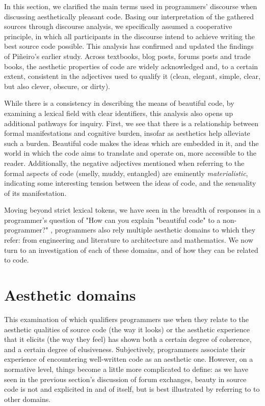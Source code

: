 \vspace{1\baselineskip}

In this section, we clarified the main terms used in programmers' discourse when discussing aesthetically pleasant code. Basing our interpretation of the gathered sources through discourse analysis, we specifically assumed a cooperative principle, in which all participants in the discourse intend to achieve writing the best source code possible. This analysis has confirmed and updated the findings of Piñeiro's earlier study. Across textbooks, blog posts, forums posts and trade books, the aesthetic properties of code are widely acknowledged and, to a certain extent, consistent in the adjectives used to qualify it (clean, elegant, simple, clear, but also clever, obscure, or dirty).

While there is a consistency in describing the means of beautiful code, by examining a lexical field with clear identifiers, this analysis also opens up additional pathways for inquiry. First, we see that there is a relationship between formal manifestations and cognitive burden, insofar as aesthetics help alleviate such a burden. Beautiful code makes the ideas which are embedded in it, and the world in which the code aims to translate and operate on, more accessible to the reader. Additionally, the negative adjectives mentioned when referring to the formal aspects of code (smelly, muddy, entangled) are eminently \emph{materialistic}, indicating some interesting tension between the ideas of code, and the sensuality of its manifestation.

Moving beyond strict lexical tokens, we have seen in the breadth of responses in a programmer's question of "How can you explain "beautiful code" to a non-programmer?" \citep{how_2013a}, programmers also rely multiple aesthetic domains to which they refer: from engineering and literature to architecture and mathematics. We now turn to an investigation of each of these domains, and of how they can be related to code.

\pagebreak

\section{Aesthetic domains}
\label{sec:aesthetic-domains}

This examination of which qualifiers programmers use when they relate to the aesthetic qualities  of source code (the way it looks) or the aesthetic experience that it elicits (the way they feel) has shown both a certain degree of coherence, and a certain degree of elusiveness. Subjectively, programmers associate their experience of encountering well-written code as an aesthetic one. However, on a normative level, things become a little more complicated to define: as we have seen in the previous section's discussion of forum exchanges, beauty in source code is not and explicited in and of itself, but is best illustrated by referring to to other domains.

